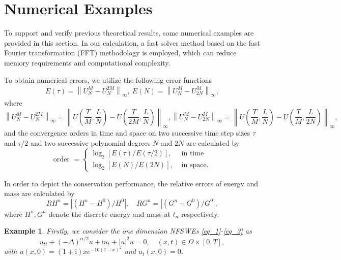\documentclass[preprint,compress,3p,10pt,fleqn]{elsarticle}
\numberwithin{equation}{section}
\newtheorem{expl}{Example}[section]
\newenvironment{example}{\begin{expl}\rm}{\end{expl}}
\begin{document}
\section{Numerical Examples}\label{Section 4}
To support and verify previous theoretical results, some numerical examples are provided in this section.
In our calculation, a fast solver method based on the fast Fourier transformation (FFT) methodology is employed, which can reduce memory requirements and computational complexity.

To obtain numerical errors, we utilize the following error functions
\begin{align}\label{eq_103}
E(\tau)=\left\|U_{N}^{M}-U_{N}^{2 M}\right\|_{\infty},~E(N)=\left\|U_{N}^{M}-U_{2 N}^{M}\right\|_{\infty},
\end{align}
where
$$\left\|U_{N}^{M}-U_{N}^{2 M}\right\|_{\infty}=\left\|U\left(\frac{T}{M}, \frac{L}{N}\right)-U\left(\frac{T}{2 M}, \frac{L}{N}\right)\right\|_{\infty},\left\|U_{N}^{M}-U_{2 N}^{M}\right\|_{\infty}=\left\|U\left(\frac{T}{M}, \frac{L}{N}\right)-U\left(\frac{T}{M}, \frac{L}{2 N}\right)\right\|_{\infty},$$
and the convergence orders in time and space on two successive time step sizes $\tau$ and $\tau / 2$ and two successive polynomial degrees $N$ and $2 N$ are calculated by
\begin{equation}
\text { order }= \left\{
\begin{aligned}
\log _{2}[E(\tau) / E(\tau / 2)], & \text { in time } \\
\log _{2}[E(N) / E(2 N)], & \text { in space. }
\end{aligned}\right.\label{eq_104}
\end{equation}

In order to depict the conservation performance, the relative errors of energy and mass are calculated by
\begin{equation}\label{eq_105}
R H^{n}=\left|\left(H^{n}-H^{0}\right) / H^{0}\right|, \quad R G^{n}=\left|\left(G^{n}-G^{0}\right) / G^{0}\right|,
\end{equation}
where $H^{n}, G^{n}$ denote the discrete energy and mass at $t_n$ respectively.


\begin{example}\label{ex:2}
Firstly, we consider the one dimension NFSWEs \eqref{eq_1}-\eqref{eq_3} as
\begin{equation}\label{eq_108}
u_{t t}+(-\Delta)^{\alpha / 2} u+\mathrm{i}u_t+|u|^2 u=0, \quad (x,t)\in  \Omega\times[0, T],
\end{equation}
with $u(x, 0)=(1+\mathrm{i}) x e^{-10(1-x)^2}$ and $u_t(x, 0)=0$.
\end{example}
\end{document}
